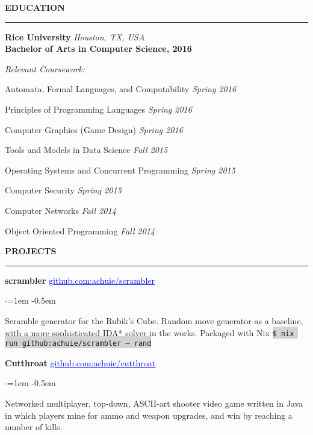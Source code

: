 \documentclass[10pt, a4paper]{article}
\newenvironment{aSection}[1]{
    \medskip \textbf{\uppercase{#1}}
    \smallskip
    \hrule
    \begin{list}{}{
            \setlength{\leftmargin}{1.5em}
        }
    \item[]
    }{
    \end{list}
}
\newenvironment{projSubsection}[2]{
    {#1} \hfill {#2}
    \smallskip
    \begin{list}{$\cdot$}{\leftmargin=1em}
    \itemsep -0.5em \vspace{-0.5em}
    }{
    \end{list}
    \vspace{0.5em}
}
\begin{document}
\begin{aSection}{Education} \textbf{Rice University} \hfill \textit{Houston, TX, USA}\\
    \textbf{Bachelor of Arts in Computer Science, 2016}

    \textit{Relevant Coursework:}
    \item Automata, Formal Languages, and Computability \hfill{\em Spring 2016}
    \item Principles of Programming Languages \hfill{\em Spring 2016}
    \item Computer Graphics (Game Design) \hfill{\em Spring 2016}
    \item Tools and Models in Data Science \hfill{\em Fall 2015}
    \item Operating Systems and Concurrent Programming \hfill{\em Spring 2015}
    \item Computer Security \hfill{\em Spring 2015} \item Computer Networks \hfill{\em Fall 2014}
    \item Object Oriented Programming \hfill{\em Fall 2014}
\end{aSection}

\begin{aSection}{Projects}
    \begin{projSubsection}
        {\textbf{scrambler}}
        {\href{https://www.github.com/achuie/scrambler}{\textcolor{blue}{\underline{github.com:achuie/scrambler}}}}
    \item[] Scramble generator for the Rubik's Cube. Random move generator as a baseline, with a more sophisticated IDA*
        solver in the works. Packaged with Nix \colorbox{lightgray}{\texttt{\$ nix run github:achuie/scrambler -- rand}}
    \end{projSubsection}

    \begin{projSubsection}
        {\textbf{Cutthroat}}
        {\href{https://www.github.com/achuie/cutthroat}{\textcolor{blue}{\underline{github.com:achuie/cutthroat}}}}
    \item[] Networked multiplayer, top-down, ASCII-art shooter video game written in Java in which
        players mine for ammo and weapon upgrades, and win by reaching a number of kills.
    \end{projSubsection}
\end{aSection}
\end{document}
